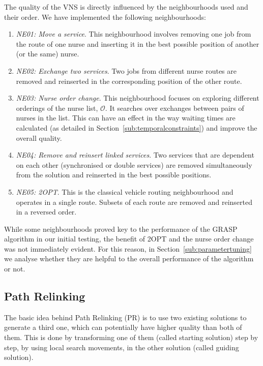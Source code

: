 \documentclass[a4paper,11pt,authoryear]{elsarticle}
\begin{document}
The quality of the VNS is directly influenced by the neighbourhoods used and their order. We have implemented the following neighbourhoods:
\begin{enumerate}[label={(\arabic*)}]
    \item \textit{NE01: Move a service}. This neighbourhood involves removing one job from the route of one nurse and inserting it in the best possible position of another (or the same) nurse.
    \item \textit{NE02: Exchange two services}. Two jobs from different nurse routes are removed and reinserted in the corresponding position of the other route.
    \item \textit{NE03: Nurse order change}. This neighbourhood focuses on exploring different orderings of the nurse list, $\mathcal{O}$. It searches over exchanges between pairs of nurses in the list. 
    This can have an effect in the way waiting times are calculated (as detailed in Section~\ref{sub:temporalconstraints}) and improve the overall quality.
    \item \textit{NE04: Remove and reinsert linked services}. Two services that are dependent on each other (synchronised or double services) are removed simultaneously from the solution and reinserted in the best possible positions.
    \item \textit{NE05: 2OPT}. This is the classical vehicle routing neighbourhood and operates in a single route. Subsets of each route are removed and reinserted in a reversed order.
\end{enumerate}

\noindent While some neighbourhoods proved key to the performance of the GRASP algorithm in our initial testing, the benefit of 2OPT and the nurse order change was not immediately evident. For this reason, in Section~\ref{sub:parametertuning} we analyse whether they are helpful to the overall performance of the algorithm or not.

\subsection{Path Relinking}
\label{sub:pathrelinking}
\noindent The basic idea behind Path Relinking (PR) \citep{laguna1999,resende2016} is to use two existing solutions to generate a third one, which can potentially have higher quality than both of them.
This is done by transforming one of them (called starting solution) step by step, by using local search movements, in the other solution (called guiding solution).
\end{document}
